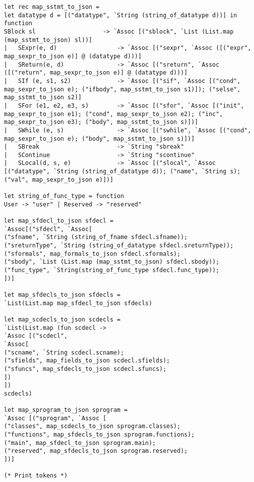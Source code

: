 \begin{verbatim}
let rec map_sstmt_to_json = 
let datatype d = [("datatype", `String (string_of_datatype d))] in
function
SBlock sl        			-> `Assoc [("sblock", `List (List.map (map_sstmt_to_json) sl))]
|   SExpr(e, d)          		-> `Assoc [("sexpr", `Assoc ([("expr", map_sexpr_to_json e)] @ (datatype d)))]
|   SReturn(e, d)    			-> `Assoc [("sreturn", `Assoc ([("return", map_sexpr_to_json e)] @ (datatype d)))]
|   SIf (e, s1, s2)       		-> `Assoc [("sif", `Assoc [("cond", map_sexpr_to_json e); ("ifbody", map_sstmt_to_json s1)]); ("selse", map_sstmt_to_json s2)]
|   SFor (e1, e2, e3, s)  		-> `Assoc [("sfor", `Assoc [("init", map_sexpr_to_json e1); ("cond", map_sexpr_to_json e2); ("inc", map_sexpr_to_json e3); ("body", map_sstmt_to_json s)])]
|   SWhile (e, s)    			-> `Assoc [("swhile", `Assoc [("cond", map_sexpr_to_json e); ("body", map_sstmt_to_json s)])]
|   SBreak           			-> `String "sbreak"
|   SContinue        			-> `String "scontinue"
|   SLocal(d, s, e)  			-> `Assoc [("slocal", `Assoc [("datatype", `String (string_of_datatype d)); ("name", `String s); ("val", map_sexpr_to_json e)])]

let string_of_func_type = function
User -> "user" | Reserved -> "reserved"

let map_sfdecl_to_json sfdecl =
`Assoc[("sfdecl", `Assoc[
("sfname", `String (string_of_fname sfdecl.sfname));
("sreturnType", `String (string_of_datatype sfdecl.sreturnType));
("sformals", map_formals_to_json sfdecl.sformals);
("sbody", `List (List.map (map_sstmt_to_json) sfdecl.sbody));
("func_type", `String(string_of_func_type sfdecl.func_type));
])] 

let map_sfdecls_to_json sfdecls =
`List(List.map map_sfdecl_to_json sfdecls)

let map_scdecls_to_json scdecls = 		
`List(List.map (fun scdecl -> 
`Assoc [("scdecl", 
`Assoc[
("scname", `String scdecl.scname); 
("sfields", map_fields_to_json scdecl.sfields);
("sfuncs", map_sfdecls_to_json scdecl.sfuncs);
])
]) 
scdecls)

let map_sprogram_to_json sprogram = 
`Assoc [("sprogram", `Assoc [
("classes", map_scdecls_to_json sprogram.classes);
("functions", map_sfdecls_to_json sprogram.functions);
("main", map_sfdecl_to_json sprogram.main);
("reserved", map_sfdecls_to_json sprogram.reserved);
])]

(* Print tokens *)


\end{verbatim}
